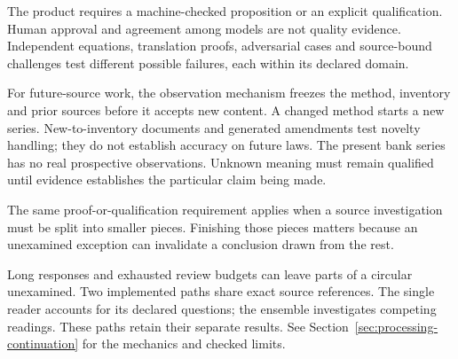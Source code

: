 \documentclass[12pt,a4paper,oneside,openany]{book}
\begin{document}
The product requires a machine-checked proposition or an explicit qualification.
Human approval and agreement among models are not quality evidence. Independent
equations, translation proofs, adversarial cases and source-bound challenges
test different possible failures, each within its declared domain.

For future-source work, the observation mechanism freezes the method, inventory
and prior sources before it accepts new content. A changed method starts a new
series. New-to-inventory documents and generated amendments test novelty handling;
they do not establish accuracy on future laws. The present bank series has no
real prospective observations. Unknown meaning must remain qualified until
evidence establishes the particular claim being made.

\clearpage
{}
The same proof-or-qualification requirement applies when a source investigation
must be split into smaller pieces. Finishing those pieces matters because an
unexamined exception can invalidate a conclusion drawn from the rest.

Long responses and exhausted review budgets can leave parts of a circular
unexamined. Two implemented paths share exact source references. The single
reader accounts for its declared questions; the ensemble investigates competing
readings. These paths retain their separate results. See
Section~\ref{sec:processing-continuation} for the mechanics and checked limits.
\end{document}

